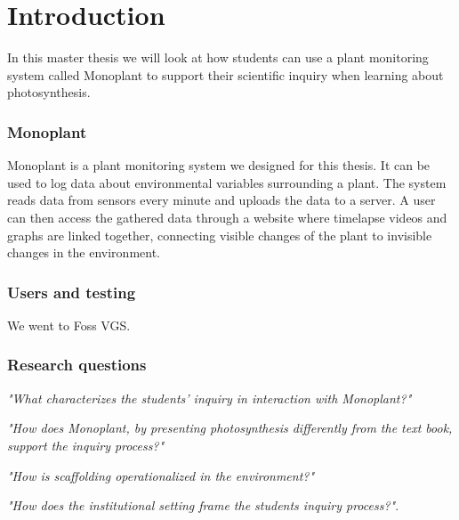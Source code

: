 \chapter{Introduction}
In this master thesis we will look at how students can use a plant monitoring system called Monoplant to support their scientific inquiry when learning about photosynthesis.

\subsection{Monoplant}
Monoplant is a plant monitoring system we designed for this thesis. It can be used to log data about environmental variables surrounding a plant. The system reads data from sensors every minute and uploads the data to a server. A user can then access the gathered data through a website where timelapse videos and graphs are linked together, connecting visible changes of the plant to invisible changes in the environment.

\subsection{Users and testing}
We went to Foss VGS.

\subsection{Research questions}

\emph{"What characterizes the students’ inquiry in interaction with Monoplant?"}

\emph{"How does Monoplant, by presenting photosynthesis differently from the text book, support the inquiry process?"}

\emph{"How is scaffolding operationalized in the environment?"}

\emph{"How does the institutional setting frame the students inquiry process?"}.
